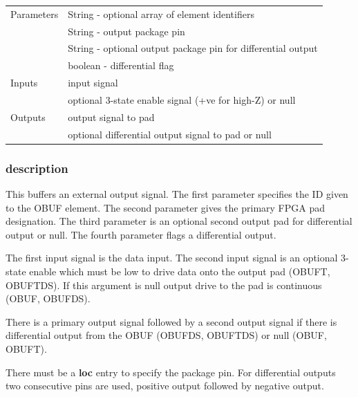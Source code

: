                 \begin{tabular}{| l | l |}
                \hline
                Parameters  & String  - optional array of element identifiers \\
                            & String  - output package pin \\
                            & String  - optional output package pin for differential output\\
                            & boolean - differential flag \\
                \hline
                Inputs      & input signal \\
                            & optional 3-state enable signal (+ve for high-Z) or null\\
                \hline
                Outputs     & output signal to pad \\
                            & optional differential output signal to pad or null \\
                \hline
                \end{tabular}

            \subsubsection{description}

                This buffers an external output signal. The first parameter
                specifies the ID given to the OBUF element. The second parameter
                gives the primary FPGA pad designation. The third parameter is an
                optional second output pad for differential output or null. The
                fourth parameter flags a differential output.
                
                The first input signal is the data input. The second input signal
                is an optional 3-state enable which must be low to drive data onto
                the output pad (OBUFT, OBUFTDS). If this argument is null output
                drive to the pad is continuous (OBUF, OBUFDS).
                
                There is a primary output signal followed by a second output
                signal if there is differential output from the OBUF
                (OBUFDS, OBUFTDS) or null (OBUF, OBUFT).

                There must be a {\bf loc} entry to specify the package pin. For
                differential outputs two consecutive pins are used, positive output
                followed by negative output.

